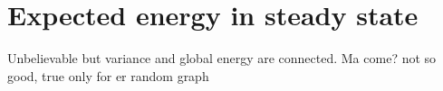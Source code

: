 \documentclass[12pt]{report}
\begin{document}
\section{Expected energy in steady state}

Unbelievable but variance and global energy are connected. Ma come?
not so good, true only for er random graph
\end{document}
